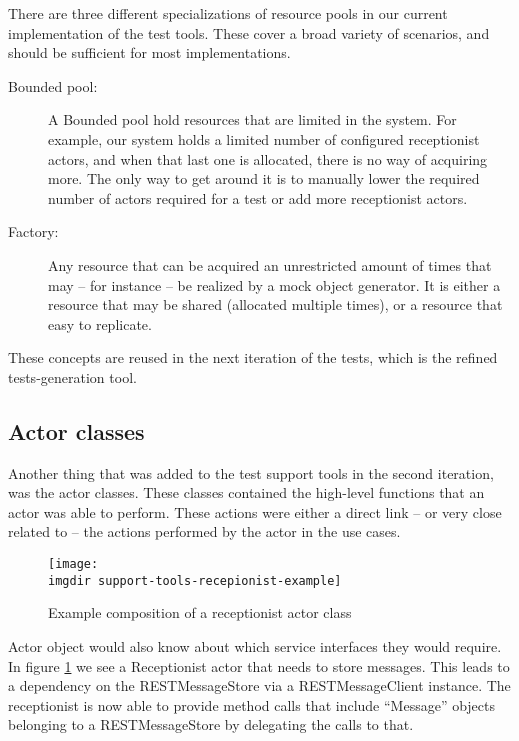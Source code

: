 \noindent There are three different specializations of resource pools in our current implementation of the test tools. These cover a broad variety of scenarios, and should be sufficient for most implementations.
\begin{description}
  \item[Bounded pool:] A Bounded pool hold resources that are limited in the system. For example, our system holds a limited number of configured receptionist actors, and when that last one is allocated, there is no way of acquiring more. The only way to get around it is to manually lower the required number of actors required for a test or add more receptionist actors.
  \item[Factory:] Any resource that can be acquired an unrestricted amount of times that may -- for instance -- be realized by a mock object generator. It is either a resource that may be shared (allocated multiple times), or a resource that easy to replicate.
\end{description}
These concepts are reused in the next iteration of the tests, which is the refined tests-generation tool.

\subsection{Actor classes}
Another thing that was added to the test support tools in the second iteration, was the actor classes. These classes contained the high-level functions that an actor was able to perform. These actions were either a direct link -- or very close related to -- the actions performed by the actor in the use cases.\medskip

\begin{figure}[!htbp]
 \centering
 \texttt{[image: \\imgdir support-tools-recepionist-example]}
 \caption{Example composition of a receptionist actor class}
 \label{fig:support-tools-recepionist-example}
\end{figure}

\noindent Actor object would also know about which service interfaces they would require. In figure \ref{fig:support-tools-recepionist-example} we see a Receptionist actor that needs to store messages. This leads to a dependency on the RESTMessageStore via a RESTMessageClient instance. The receptionist is now able to provide method calls that include ``Message'' objects belonging to a RESTMessageStore by delegating the calls to that.

